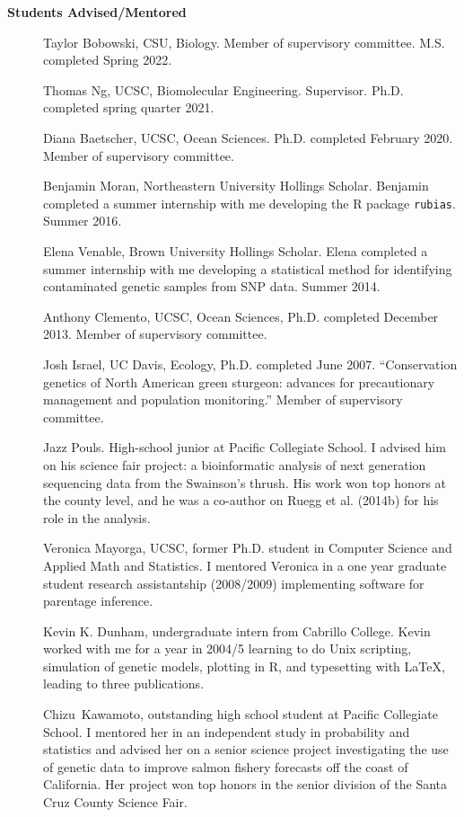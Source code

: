 \documentclass[11pt]{article}
\newlength{\postskip}
\begin{document}
{\bf Students Advised/Mentored}
\begin{description}
\item[] Taylor Bobowski, CSU, Biology. Member of supervisory committee.  M.S. completed Spring 2022.
\item[] Thomas Ng, UCSC, Biomolecular Engineering.  Supervisor.  Ph.D. completed spring quarter 2021.
\item[] Diana Baetscher, UCSC, Ocean Sciences.  Ph.D. completed February 2020. Member of supervisory committee.
\item[] Benjamin Moran, Northeastern University Hollings Scholar.  Benjamin completed a summer internship with
me developing the R package {\tt rubias}. Summer 2016.
\item[] Elena Venable, Brown University Hollings Scholar.  Elena completed a summer internship with me developing 
a statistical method for identifying contaminated genetic samples from SNP data. Summer 2014.
\item[] Anthony Clemento, UCSC, Ocean Sciences, Ph.D. completed December 2013.  Member of supervisory committee.
\item[] Josh Israel, UC Davis, Ecology,  Ph.D. completed June 2007. ``Conservation genetics of North American green sturgeon: advances for precautionary management and population monitoring.'' Member of supervisory committee.
\item[] Jazz Pouls.  High-school junior at Pacific Collegiate School.  I advised him on his science fair project:
a bioinformatic analysis of next generation sequencing data from the Swainson's thrush.  His work won top honors
at the county level, and he was a co-author on Ruegg et al. (2014b) for his role in the analysis.
\item[] Veronica Mayorga, UCSC,  former Ph.D. student in Computer Science and Applied Math and Statistics. I mentored Veronica in a one year graduate student research assistantship (2008/2009) implementing software for parentage inference.
\item[] Kevin K. Dunham,  undergraduate intern from Cabrillo College.  Kevin worked with me for a year in 2004/5 learning to do Unix scripting, simulation of genetic models, plotting in R, and typesetting with \LaTeX{}, leading to three publications. 
\item[] Chizu~Kawamoto, outstanding high school student at Pacific Collegiate School.  I mentored her in an independent study in probability and statistics and advised her on a senior science project investigating the use of genetic data to improve salmon fishery forecasts off the coast of California.  Her project won top honors in the senior division of the Santa Cruz County Science Fair.

\end{description}
\vspace*{\postskip}
\end{document}
